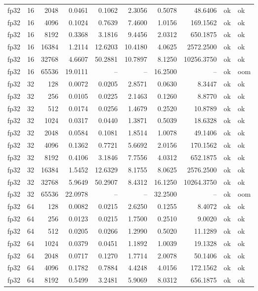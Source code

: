 \begin{tabular}{lrrrrrrrll}
fp32 & 16 & 2048 & 0.0461 & 0.1062 & 2.3056 & 0.5078 & 48.6406 & ok & ok \\
fp32 & 16 & 4096 & 0.1024 & 0.7639 & 7.4600 & 1.0156 & 169.1562 & ok & ok \\
fp32 & 16 & 8192 & 0.3368 & 3.1816 & 9.4456 & 2.0312 & 650.1875 & ok & ok \\
fp32 & 16 & 16384 & 1.2114 & 12.6203 & 10.4180 & 4.0625 & 2572.2500 & ok & ok \\
fp32 & 16 & 32768 & 4.6607 & 50.2881 & 10.7897 & 8.1250 & 10256.3750 & ok & ok \\
fp32 & 16 & 65536 & 19.0111 & -- & -- & 16.2500 & -- & ok & oom \\
fp32 & 32 & 128 & 0.0072 & 0.0205 & 2.8571 & 0.0630 & 8.3447 & ok & ok \\
fp32 & 32 & 256 & 0.0105 & 0.0225 & 2.1463 & 0.1260 & 8.8770 & ok & ok \\
fp32 & 32 & 512 & 0.0174 & 0.0256 & 1.4679 & 0.2520 & 10.8789 & ok & ok \\
fp32 & 32 & 1024 & 0.0317 & 0.0440 & 1.3871 & 0.5039 & 18.6328 & ok & ok \\
fp32 & 32 & 2048 & 0.0584 & 0.1081 & 1.8514 & 1.0078 & 49.1406 & ok & ok \\
fp32 & 32 & 4096 & 0.1362 & 0.7721 & 5.6692 & 2.0156 & 170.1562 & ok & ok \\
fp32 & 32 & 8192 & 0.4106 & 3.1846 & 7.7556 & 4.0312 & 652.1875 & ok & ok \\
fp32 & 32 & 16384 & 1.5452 & 12.6329 & 8.1755 & 8.0625 & 2576.2500 & ok & ok \\
fp32 & 32 & 32768 & 5.9649 & 50.2907 & 8.4312 & 16.1250 & 10264.3750 & ok & ok \\
fp32 & 32 & 65536 & 22.0978 & -- & -- & 32.2500 & -- & ok & oom \\
fp32 & 64 & 128 & 0.0082 & 0.0215 & 2.6250 & 0.1255 & 8.4072 & ok & ok \\
fp32 & 64 & 256 & 0.0123 & 0.0215 & 1.7500 & 0.2510 & 9.0020 & ok & ok \\
fp32 & 64 & 512 & 0.0205 & 0.0266 & 1.2990 & 0.5020 & 11.1289 & ok & ok \\
fp32 & 64 & 1024 & 0.0379 & 0.0451 & 1.1892 & 1.0039 & 19.1328 & ok & ok \\
fp32 & 64 & 2048 & 0.0717 & 0.1270 & 1.7714 & 2.0078 & 50.1406 & ok & ok \\
fp32 & 64 & 4096 & 0.1782 & 0.7884 & 4.4248 & 4.0156 & 172.1562 & ok & ok \\
fp32 & 64 & 8192 & 0.5499 & 3.2481 & 5.9069 & 8.0312 & 656.1875 & ok & ok \\

\end{tabular}
